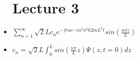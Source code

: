 \documentclass{article}
\begin{document}
\begin{itemize}
\section*{Lecture 3}
\item $\sum_{n=1}^{\infty} \sqrt{2}{L} c_n e^{-frac{-in^2\pi^2\hbar}{2mL^2}t} sin(\frac{n\pi z}{L}) $
\item $c_n = \sqrt{2}{L}\int_0^L sin(\frac{n\pi}{L}z)\Psi(z,t=0)dz$
\end{itemize}
\end{document}
